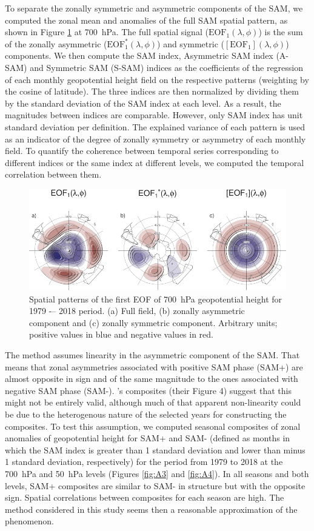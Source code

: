 \documentclass[smallextended]{svjour3}       %
\begin{document}
To separate the zonally symmetric and asymmetric components of the SAM, we computed the zonal mean and anomalies of the full SAM spatial pattern, as shown in Figure \ref{fig:method} at 700~hPa.
The full spatial signal (\(\mathrm{EOF_1}(\lambda, \phi)\)) is the sum of the zonally asymmetric (\(\mathrm{EOF_1^*}(\lambda, \phi)\)) and symmetric (\([\mathrm{EOF_1}](\lambda, \phi)\)) components.
We then compute the SAM index, Asymmetric SAM index (A\nobreakdash-SAM) and Symmetric SAM (S\nobreakdash-SAM) indices as the coefficients of the regression of each monthly geopotential height field on the respective patterns (weighting by the cosine of latitude).
The three indices are then normalized by dividing them by the standard deviation of the SAM index at each level.
As a result, the magnitudes between indices are comparable.
However, only SAM index has unit standard deviation per definition.
The explained variance of each pattern is used as an indicator of the degree of zonally symmetry or asymmetry of each monthly field.
To quantify the coherence between temporal series corresponding to different indices or the same index at different levels, we computed the temporal correlation between them.

\begin{figure}
\includegraphics{method-1} \caption{Spatial patterns of the first EOF of 700~hPa geopotential height for 1979 -– 2018 period. (a) Full field, (b) zonally asymmetric component and (c) zonally symmetric component. Arbitrary units; positive values in blue and negative values in red.}\label{fig:method}
\end{figure}

The method assumes linearity in the asymmetric component of the SAM.
That means that zonal asymmetries associated with positive SAM phase (SAM+) are almost opposite in sign and of the same magnitude to the ones associated with negative SAM phase (SAM-).
\citet{fogt2012}'s composites (their Figure 4) suggest that this might not be entirely valid, although much of that apparent non-linearity could be due to the heterogenous nature of the selected years for constructing the composites.
To test this assumption, we computed seasonal composites of zonal anomalies of geopotential height for SAM+ and SAM- (defined as months in which the SAM index is greater than 1 standard deviation and lower than minus 1 standard deviation, respectively) for the period from 1979 to 2018 at the 700~hPa and 50~hPa levels (Figures \ref{fig:A3} and \ref{fig:A4}).
In all seasons and both levels, SAM+ composites are similar to SAM- in structure but with the opposite sign.
Spatial correlations between composites for each season are high.
The method considered in this study seems then a reasonable approximation of the phenomenon.
\end{document}
